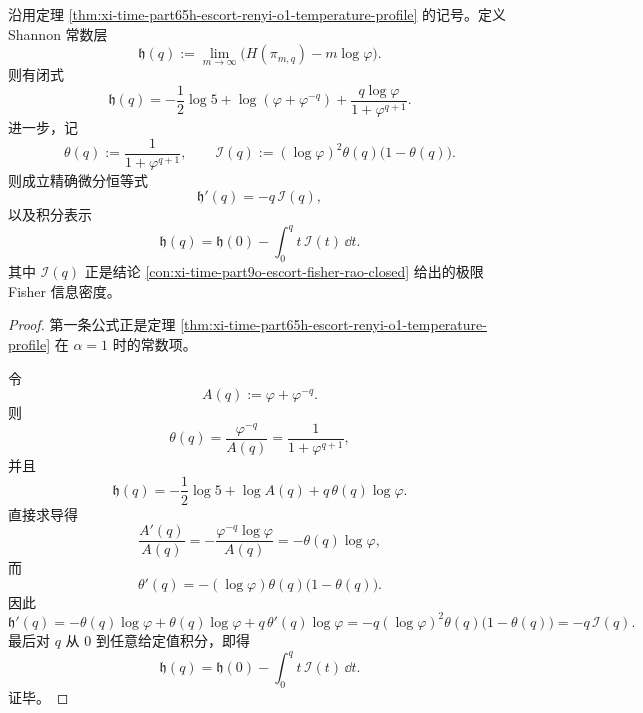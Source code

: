 \begin{theorem}\label{thm:xi-time-part65h-escort-shannon-debruijn-fisher}
沿用定理 \ref{thm:xi-time-part65h-escort-renyi-o1-temperature-profile} 的记号。定义 Shannon 常数层
\[
\mathfrak h(q):=
\lim_{m\to\infty}\bigl(H(\pi_{m,q})-m\log\varphi\bigr).
\]
则有闭式
\[
\mathfrak h(q)
=
-\frac12\log5+\log(\varphi+\varphi^{-q})
+\frac{q\log\varphi}{1+\varphi^{q+1}}.
\]
进一步，记
\[
\theta(q):=\frac{1}{1+\varphi^{q+1}},
\qquad
\mathcal I(q):=(\log\varphi)^2\theta(q)\bigl(1-\theta(q)\bigr).
\]
则成立精确微分恒等式
\[
\mathfrak h'(q)=-q\,\mathcal I(q),
\]
以及积分表示
\[
\mathfrak h(q)=\mathfrak h(0)-\int_0^q t\,\mathcal I(t)\,\dd t.
\]
其中 \(\mathcal I(q)\) 正是结论 \ref{con:xi-time-part9o-escort-fisher-rao-closed} 给出的极限 Fisher 信息密度。
\end{theorem}
\begin{proof}
第一条公式正是定理 \ref{thm:xi-time-part65h-escort-renyi-o1-temperature-profile} 在 \(\alpha=1\) 时的常数项。

令
\[
A(q):=\varphi+\varphi^{-q}.
\]
则
\[
\theta(q)=\frac{\varphi^{-q}}{A(q)}=\frac{1}{1+\varphi^{q+1}},
\]
并且
\[
\mathfrak h(q)
=
-\frac12\log5+\log A(q)+q\,\theta(q)\log\varphi.
\]
直接求导得
\[
\frac{A'(q)}{A(q)}
=
-\frac{\varphi^{-q}\log\varphi}{A(q)}
=
-\theta(q)\log\varphi,
\]
而
\[
\theta'(q)
=
-(\log\varphi)\theta(q)\bigl(1-\theta(q)\bigr).
\]
因此
\[
\mathfrak h'(q)
=
-\theta(q)\log\varphi+\theta(q)\log\varphi+q\,\theta'(q)\log\varphi
=
-q(\log\varphi)^2\theta(q)\bigl(1-\theta(q)\bigr)
=
-q\,\mathcal I(q).
\]
最后对 \(q\) 从 \(0\) 到任意给定值积分，即得
\[
\mathfrak h(q)=\mathfrak h(0)-\int_0^q t\,\mathcal I(t)\,\dd t.
\]
证毕。
\end{proof}

